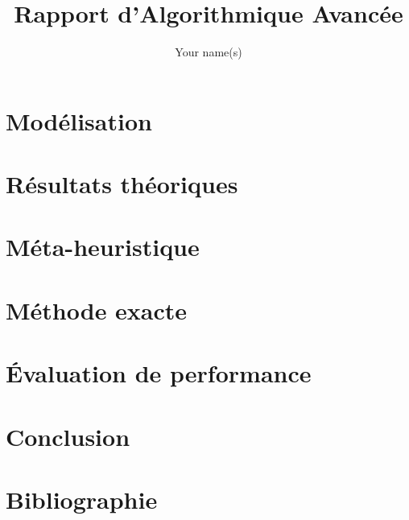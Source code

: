 \documentclass{article}
\title{Rapport d'Algorithmique Avancée}
\author{ Your name(s) }
\begin{document}
\maketitle

\newpage



\tableofcontents

\newpage



\section{Modélisation}
\section{Résultats théoriques}
\section{Méta-heuristique}
\section{Méthode exacte}
\section{Évaluation de performance}

\section{Conclusion}

\section{Bibliographie}
\end{document}
